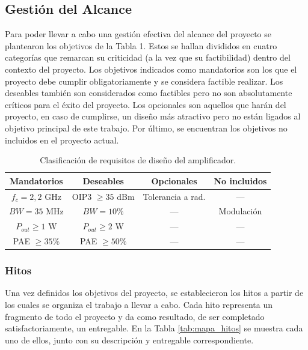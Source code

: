 \subsection{Gestión del Alcance}
Para poder llevar a cabo una gestión efectiva del alcance del proyecto se plantearon los objetivos de la Tabla 1. Estos se hallan divididos en cuatro categorías que remarcan su criticidad (a la vez que su factibilidad) dentro del contexto del proyecto. Los objetivos indicados como mandatorios son los que el proyecto debe cumplir obligatoriamente y se considera factible realizar. Los deseables también son considerados como factibles pero no son absolutamente críticos para el éxito del proyecto. Los opcionales son aquellos que harán del proyecto, en caso de cumplirse, un diseño más atractivo pero no están ligados al objetivo principal de este trabajo. Por último, se encuentran los objetivos no incluidos en el proyecto actual.

\begin{table}[H]
    \centering
    \caption{Clasificación de requisitos de diseño del amplificador.}
    \label{tab:requisitos_clasificados}
    \renewcommand{\arraystretch}{1.1}
    \begin{tabular}{cccc}
        \hline\hline
        \textbf{Mandatorios} & \textbf{Deseables} & \textbf{Opcionales} & \textbf{No incluidos} \\
        \hline
        $f_{c} = 2{,}2$ GHz  & OIP3 $\ge 35$ dBm  & Tolerancia a rad.   & ---        \\
        $BW = 35$ MHz        & $BW = 10 \%$       & ---                 & Modulación \\
        $P_{out} \ge 1$ W    & $P_{out} \ge 2$ W  & ---                 & ---        \\
        PAE $\ge 35 \%$      & PAE $\ge 50 \%$    & ---                 & ---        \\
        \hline\hline
    \end{tabular}
\end{table}

\subsubsection{Hitos}
Una vez definidos los objetivos del proyecto, se establecieron los hitos a partir de los cuales se organiza el trabajo a llevar a cabo. Cada hito representa un fragmento de todo el proyecto y da como resultado, de ser completado satisfactoriamente, un entregable. En la Tabla \ref{tab:mapa_hitos} se muestra cada uno de ellos, junto con su descripción y entregable correspondiente.

